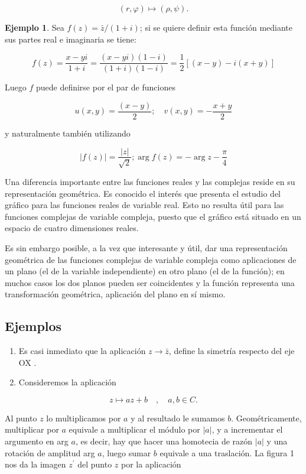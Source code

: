 \documentclass[10pt]{article}
\theoremstyle{plain}
\theoremstyle{definition}
\newtheorem{example}[theorem]{Ejemplo}
\theoremstyle{remark}
\begin{document}
$$
(r, \varphi) \mapsto(\rho, \psi) .
$$

\begin{example}
Sea $f(z)=\bar{z} / (1+i)$; si se quiere definir esta función mediante sus partes real e imaginaria se tiene:

$$
f(z)=\frac{x-y i}{1+i}=\frac{(x-y i)(1-i)}{(1+i)(1-i)}=\frac{1}{2}[(x-y)-i(x+y)]
$$


Luego $f$ puede definirse por el par de funciones

$$
u(x, y)=\frac{(x-y)}{2} ; \quad v(x, y)=-\frac{x+y}{2}
$$

y naturalmente también utilizando

$$
|f(z)|=\frac{|z|}{\sqrt{2}} ; \arg f(z)=-\arg z-\frac{\pi}{4}
$$
\end{example}

Una diferencia importante entre las funciones reales y las complejas reside en su representación geométrica. Es conocido el interés que presenta el estudio del gráfico para las funciones reales de variable real. Esto no resulta útil para las funciones complejas de variable compleja, puesto que el gráfico está situado en un espacio de cuatro dimensiones reales.

Es sin embargo posible, a la vez que interesante y útil, dar una representación geométrica de las funciones complejas de variable compleja como aplicaciones de un plano (el de la variable independiente) en otro plano (el de la función); en muchos casos los dos planos pueden ser coincidentes y la función representa una transformación geométrica, aplicación del plano en sí mismo.

\subsection{Ejemplos}
\begin{enumerate}
  \item Es casi inmediato que la aplicación $z \rightarrow \bar{z}$, define la simetría respecto del eje OX .
  \item Consideremos la aplicación
\end{enumerate}


\begin{equation*}
z \mapsto a z+b \quad, \quad a, b \in C . \tag{$2\cdot1$}
\end{equation*}


Al punto $z$ lo multiplicamos por $a$ y al resultado le sumamos $b$.
Geométricamente, multiplicar por $a$ equivale a multiplicar el módulo por $|a|$, y a incrementar el argumento en arg $a$, es decir, hay que hacer una homotecia de razón $|a|$ y una rotación de amplitud arg $a$, luego sumar $b$ equivale a una traslación. La figura 1 nos da la imagen $z^{\prime}$ del punto $z$ por la aplicación
\end{document}
